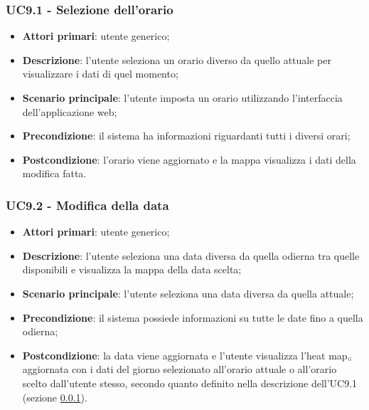 \subsubsection{UC9.1 - Selezione dell’orario}\label{CasiDUsoCasiDUsoTraUnUtenteEIlFrontEndElencoCasiDUsoUC51SelezioneDellOrario}
\begin{itemize}
	\item \textbf{Attori primari}: utente generico;
	\item \textbf{Descrizione}: l’utente seleziona un orario diverso da quello attuale per visualizzare i dati di quel momento;
	\item \textbf{Scenario principale}: l’utente imposta un orario utilizzando l’interfaccia dell’applicazione web;
	\item \textbf{Precondizione}: il sistema ha informazioni riguardanti tutti i diversi orari; %
	\item \textbf{Postcondizione}:  l’orario viene aggiornato e la mappa visualizza i dati della modifica fatta.
\end{itemize}

\subsubsection{UC9.2 - Modifica della data}\label{CasiDUsoCasiDUsoTraUnUtenteEIlFrontEndElencoCasiDUsoUC52ModificaDellaData}
\begin{itemize}
	\item \textbf{Attori primari}: utente generico;
	\item \textbf{Descrizione}: l’utente seleziona una data diversa da quella odierna tra quelle disponibili e visualizza la mappa della data scelta;
	\item \textbf{Scenario principale}: l’utente seleziona una data diversa da quella attuale;
	\item \textbf{Precondizione}: il sistema possiede informazioni su tutte le date fino a quella odierna;
	\item \textbf{Postcondizione}: la data viene aggiornata e l’utente visualizza l’heat map$_{\scaleto{G}{3pt}}$ aggiornata con i dati del giorno selezionato all’orario attuale o all’orario scelto dall’utente stesso, secondo quanto definito nella descrizione dell’UC9.1 (sezione \ref{CasiDUsoCasiDUsoTraUnUtenteEIlFrontEndElencoCasiDUsoUC51SelezioneDellOrario}).
\end{itemize}

